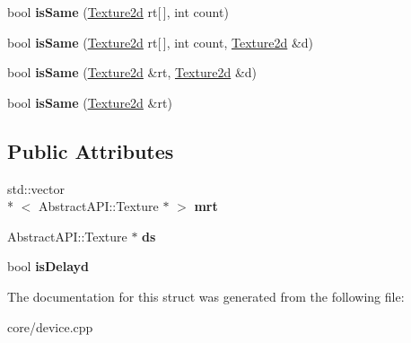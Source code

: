 \begin{DoxyCompactItemize}
\item 
\hypertarget{struct_device_1_1_data_1_1_begin_paint_arg_ac435b01b9d2e046ccd1f26d69cbde7e3}{bool {\bfseries is\+Same} (\hyperlink{class_tempest_1_1_texture2d}{Texture2d} rt\mbox{[}$\,$\mbox{]}, int count)}\label{struct_device_1_1_data_1_1_begin_paint_arg_ac435b01b9d2e046ccd1f26d69cbde7e3}

\item 
\hypertarget{struct_device_1_1_data_1_1_begin_paint_arg_a2ac0648e729856da25642f87da6f6015}{bool {\bfseries is\+Same} (\hyperlink{class_tempest_1_1_texture2d}{Texture2d} rt\mbox{[}$\,$\mbox{]}, int count, \hyperlink{class_tempest_1_1_texture2d}{Texture2d} \&d)}\label{struct_device_1_1_data_1_1_begin_paint_arg_a2ac0648e729856da25642f87da6f6015}

\item 
\hypertarget{struct_device_1_1_data_1_1_begin_paint_arg_a4290e052d845f0b0bdf9e06c940b24b4}{bool {\bfseries is\+Same} (\hyperlink{class_tempest_1_1_texture2d}{Texture2d} \&rt, \hyperlink{class_tempest_1_1_texture2d}{Texture2d} \&d)}\label{struct_device_1_1_data_1_1_begin_paint_arg_a4290e052d845f0b0bdf9e06c940b24b4}

\item 
\hypertarget{struct_device_1_1_data_1_1_begin_paint_arg_a6f953dd65cf081b2ec35b4308e076c74}{bool {\bfseries is\+Same} (\hyperlink{class_tempest_1_1_texture2d}{Texture2d} \&rt)}\label{struct_device_1_1_data_1_1_begin_paint_arg_a6f953dd65cf081b2ec35b4308e076c74}

\end{DoxyCompactItemize}
\subsection*{Public Attributes}
\begin{DoxyCompactItemize}
\item 
\hypertarget{struct_device_1_1_data_1_1_begin_paint_arg_a6100e8e999de7c0d7d758a2b979a8d06}{std\+::vector\\*
$<$ Abstract\+A\+P\+I\+::\+Texture $\ast$ $>$ {\bfseries mrt}}\label{struct_device_1_1_data_1_1_begin_paint_arg_a6100e8e999de7c0d7d758a2b979a8d06}

\item 
\hypertarget{struct_device_1_1_data_1_1_begin_paint_arg_a2be78bf52b4a747ece38672c7dea4fd9}{Abstract\+A\+P\+I\+::\+Texture $\ast$ {\bfseries ds}}\label{struct_device_1_1_data_1_1_begin_paint_arg_a2be78bf52b4a747ece38672c7dea4fd9}

\item 
\hypertarget{struct_device_1_1_data_1_1_begin_paint_arg_af6c0c18f30e6ea8f8bb54f5ddd37dc46}{bool {\bfseries is\+Delayd}}\label{struct_device_1_1_data_1_1_begin_paint_arg_af6c0c18f30e6ea8f8bb54f5ddd37dc46}

\end{DoxyCompactItemize}


The documentation for this struct was generated from the following file\+:\begin{DoxyCompactItemize}
\item 
core/device.\+cpp\end{DoxyCompactItemize}
